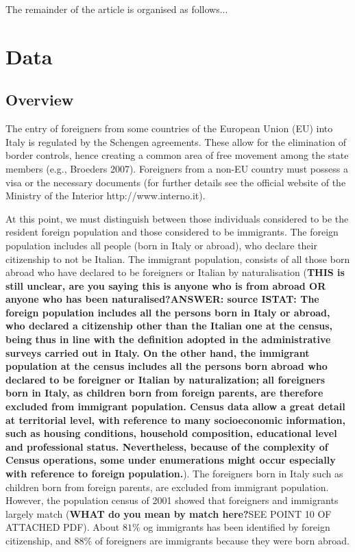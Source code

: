 \documentclass[10pt] {article}
\theoremstyle{definition}
\theoremstyle{plain}
\begin{document}
The remainder of the article is organised as follows...


\section{Data \label{DAT}}

\subsection{Overview \label{SDC}}

The entry of foreigners from some countries of the European Union (EU) into Italy is regulated by the Schengen agreements. These allow for the elimination of border controls, hence creating a common area of free movement among the state members (e.g., Broeders 2007). Foreigners from a non-EU country must possess a visa or the necessary documents (for further details see the official website of the Ministry of the Interior http://www.interno.it). 
 
At this point, we must distinguish between those individuals considered to be the resident foreign population and those considered to be immigrants. The foreign population includes all people (born in Italy or abroad), who declare their citizenship to not be Italian. The immigrant population, consists of all those born abroad who have declared to be foreigners or Italian by naturalisation ({\bf THIS is still unclear, are you saying this is anyone who is from abroad OR anyone who has been naturalised?ANSWER: source ISTAT: The foreign population includes all the persons born in Italy or abroad, who declared a citizenship other than the Italian one at the census, being thus in line with the definition adopted in the administrative surveys carried out in Italy. On the other hand, the immigrant population at the census includes all the persons born abroad who declared to be foreigner or Italian by naturalization; all foreigners born in Italy, as children born from foreign parents, are therefore excluded from immigrant population. Census data allow a great detail at territorial level, with reference to many socioeconomic information, such as housing conditions, household composition, educational level and professional status. Nevertheless, because of the complexity of Census operations, some under enumerations might occur especially with reference to foreign population.}). The foreigners born in Italy such as children born from foreign parents, are excluded from immigrant population. However, the population census of 2001 showed that foreigners and immigrants largely match ({\bf WHAT do you mean by match here?}SEE POINT 10 OF ATTACHED PDF). About $81\%$ og immigrants has been identified by foreign citizenship, and $88\%$ of foreigners are immigrants because they were born abroad.
\end{document}

